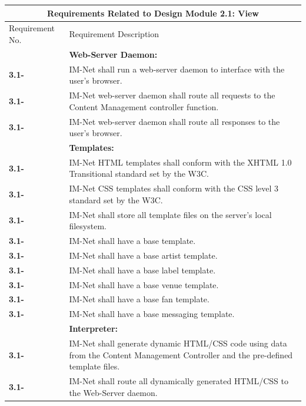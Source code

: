 \documentclass[letterpaper,12pt]{article}
\newcounter{rcounter}						%
\newcommand\rnumber{\stepcounter{rcounter}\arabic{rcounter}}
\begin{document}
{\begin{center}
\begin{tabular}{|l|p{6in}|}
\hline 
\multicolumn{2}{|c|}{\textbf{Requirements Related to Design Module 2.1: View}} \\ 
\hline 
Requirement No. & Requirement Description \\ 
\hline
& \textbf{Web-Server Daemon:} \\
\hline
\textbf{3.1-\rnumber} & IM-Net shall run a web-server daemon to interface with the user's browser. \\ 
\hline 
\textbf{3.1-\rnumber} & IM-Net web-server daemon shall route all requests to the Content Management controller function. \\ 
\hline 
\textbf{3.1-\rnumber} & IM-Net web-server daemon shall route all responses to the user's browser. \\ 
\hline  
& \textbf{Templates:} \\
\hline
\textbf{3.1-\rnumber} & IM-Net HTML templates shall conform with the XHTML 1.0 Transitional standard set by the W3C. \\ 
\hline 
\textbf{3.1-\rnumber} & IM-Net CSS templates shall conform with the CSS level 3 standard set by the W3C. \\ 
\hline 
\textbf{3.1-\rnumber} & IM-Net shall store all template files on the server's local filesystem. \\
\hline
\textbf{3.1-\rnumber} & IM-Net shall have a base template. \\ 
\hline 
\textbf{3.1-\rnumber} & IM-Net shall have a base artist template. \\ 
\hline 
\textbf{3.1-\rnumber} & IM-Net shall have a base label template. \\ 
\hline 
\textbf{3.1-\rnumber} & IM-Net shall have a base venue template. \\ 
\hline 
\textbf{3.1-\rnumber} & IM-Net shall have a base fan template. \\ 
\hline 
\textbf{3.1-\rnumber} & IM-Net shall have a base messaging template. \\ 
\hline 
& \textbf{Interpreter:} \\
\hline
\textbf{3.1-\rnumber} & IM-Net shall generate dynamic HTML/CSS code using data from the Content Management Controller and the pre-defined template files. \\ 
\hline 
\textbf{3.1-\rnumber} & IM-Net shall route all dynamically generated HTML/CSS to the Web-Server daemon. \\ 
\hline 


\end{tabular}
\end{center}}
\end{document}
